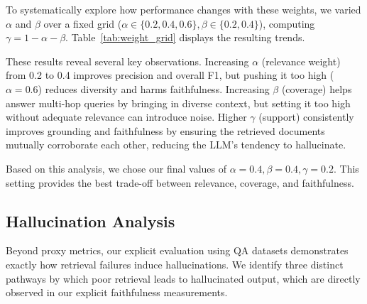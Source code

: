 \documentclass[conference]{IEEEtran}
\begin{document}
To systematically explore how performance changes with these weights, we varied $\alpha$ and $\beta$ over a fixed grid ($\alpha \in \{0.2, 0.4, 0.6\}, \beta \in \{0.2, 0.4\}$), computing $\gamma = 1 - \alpha - \beta$. Table~\ref{tab:weight_grid} displays the resulting trends.

\begin{table}[H]
\centering
\caption{Systematic Weight Sensitivity Analysis ($\gamma = 1 - \alpha - \beta$).}
\label{tab:weight_grid}
\end{table}

These results reveal several key observations. Increasing $\alpha$ (relevance weight) from 0.2 to 0.4 improves precision and overall F1, but pushing it too high ($\alpha=0.6$) reduces diversity and harms faithfulness. Increasing $\beta$ (coverage) helps answer multi-hop queries by bringing in diverse context, but setting it too high without adequate relevance can introduce noise. Higher $\gamma$ (support) consistently improves grounding and faithfulness by ensuring the retrieved documents mutually corroborate each other, reducing the LLM's tendency to hallucinate.

Based on this analysis, we chose our final values of $\alpha=0.4, \beta=0.4, \gamma=0.2$. This setting provides the best trade-off between relevance, coverage, and faithfulness.



\subsection{Hallucination Analysis}

Beyond proxy metrics, our explicit evaluation using QA datasets demonstrates exactly how retrieval failures induce hallucinations. We identify three distinct pathways by which poor retrieval leads to hallucinated output, which are directly observed in our explicit faithfulness measurements.
\end{document}
